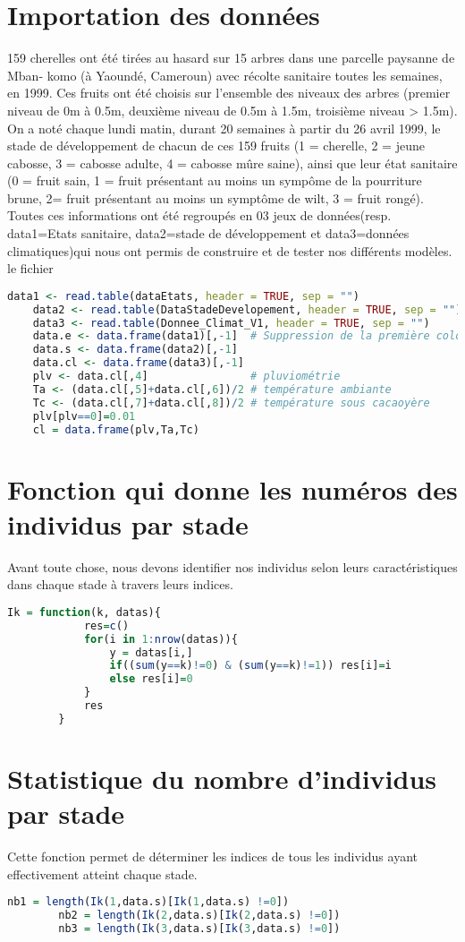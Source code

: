 \documentclass[12pt,a4paper]{scrbook}
\begin{document}
		\section{Importation des données}
159 cherelles ont été tirées au hasard sur 15 arbres dans une parcelle paysanne de Mban-
komo (à Yaoundé, Cameroun) avec récolte sanitaire toutes les semaines, en 1999. Ces fruits ont été choisis sur l’ensemble des niveaux des arbres (premier niveau de 0m à 0.5m, deuxième niveau de 0.5m à 1.5m, troisième niveau > 1.5m). On a noté chaque lundi matin, durant 20 semaines à partir du 26 avril 1999, le stade de développement de chacun de ces 159 fruits (1 = cherelle, 2 = jeune cabosse, 3 = cabosse adulte, 4 = cabosse mûre saine),
ainsi que leur état sanitaire (0 = fruit sain, 1 = fruit présentant au moins un sympôme de la pourriture brune, 2= fruit présentant au moins un symptôme de wilt, 3 = fruit rongé). Toutes ces informations ont été regroupés en 03 jeux de données(resp. data1=Etats sanitaire, data2=stade de développement et data3=données climatiques)qui nous ont permis de construire et de tester nos différents modèles. le fichier 
	\begin{lstlisting}[language=R]
	data1 <- read.table(dataEtats, header = TRUE, sep = "")
	data2 <- read.table(DataStadeDevelopement, header = TRUE, sep = "")		
	data3 <- read.table(Donnee_Climat_V1, header = TRUE, sep = "")	
	data.e <- data.frame(data1)[,-1]  # Suppression de la première colonne		
	data.s <- data.frame(data2)[,-1]
	data.cl <- data.frame(data3)[,-1]
	plv <- data.cl[,4]                # pluviométrie
	Ta <- (data.cl[,5]+data.cl[,6])/2 # température ambiante
	Tc <- (data.cl[,7]+data.cl[,8])/2 # température sous cacaoyère
	plv[plv==0]=0.01
	cl = data.frame(plv,Ta,Tc)
	\end{lstlisting}
	\section{Fonction qui donne les numéros des individus par stade}
	Avant toute chose, nous devons identifier nos individus selon leurs caractéristiques dans chaque stade à travers leurs indices.
	\begin{lstlisting}[language=R]
		Ik = function(k, datas){
			res=c()
			for(i in 1:nrow(datas)){
				y = datas[i,]
				if((sum(y==k)!=0) & (sum(y==k)!=1)) res[i]=i
				else res[i]=0
			}
			res
		}
	\end{lstlisting}
	\section{Statistique du nombre d'individus par stade}
Cette fonction permet de déterminer les indices de tous les individus ayant effectivement atteint chaque stade. 
	\begin{lstlisting}[language=R]
		nb1 = length(Ik(1,data.s)[Ik(1,data.s) !=0])
		nb2 = length(Ik(2,data.s)[Ik(2,data.s) !=0])
		nb3 = length(Ik(3,data.s)[Ik(3,data.s) !=0])
	\end{lstlisting}
\end{document}
